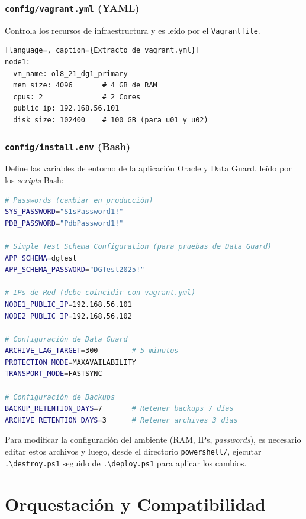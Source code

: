 \documentclass[11pt, a4paper]{report}
\begin{document}
\subsubsection{\texttt{config/vagrant.yml} (YAML)}

Controla los recursos de infraestructura y es leído por el \texttt{Vagrantfile}.
\begin{lstlisting}[language=, caption={Extracto de vagrant.yml}]
node1:
  vm_name: ol8_21_dg1_primary
  mem_size: 4096       # 4 GB de RAM
  cpus: 2              # 2 Cores
  public_ip: 192.168.56.101
  disk_size: 102400    # 100 GB (para u01 y u02)
\end{lstlisting}

\subsubsection{\texttt{config/install.env} (Bash)}

Define las variables de entorno de la aplicación Oracle y Data Guard, leído por los \textit{scripts} Bash:

\begin{lstlisting}[language=bash, caption={Valores de configuración en install.env}]
# Passwords (cambiar en producción)
SYS_PASSWORD="S1sPassword1!"
PDB_PASSWORD="PdbPassword1!"

# Simple Test Schema Configuration (para pruebas de Data Guard)
APP_SCHEMA=dgtest
APP_SCHEMA_PASSWORD="DGTest2025!"

# IPs de Red (debe coincidir con vagrant.yml)
NODE1_PUBLIC_IP=192.168.56.101
NODE2_PUBLIC_IP=192.168.56.102

# Configuración de Data Guard
ARCHIVE_LAG_TARGET=300        # 5 minutos
PROTECTION_MODE=MAXAVAILABILITY
TRANSPORT_MODE=FASTSYNC

# Configuración de Backups
BACKUP_RETENTION_DAYS=7       # Retener backups 7 días
ARCHIVE_RETENTION_DAYS=3      # Retener archives 3 días
\end{lstlisting}

Para modificar la configuración del ambiente (RAM, IPs, \textit{passwords}), es necesario editar estos archivos y luego, desde el directorio \texttt{powershell/}, ejecutar \texttt{.\textbackslash destroy.ps1} seguido de \texttt{.\textbackslash deploy.ps1} para aplicar los cambios.

\section{Orquestación y Compatibilidad}
\end{document}
